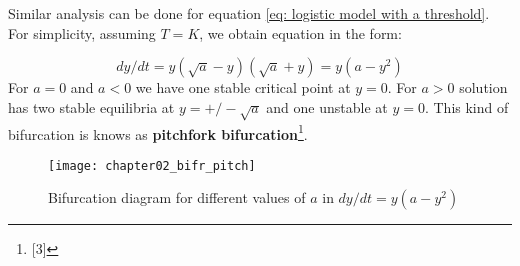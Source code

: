 Similar analysis can be done for equation \ref{eq: logistic model with a threshold}. For simplicity, assuming $T = K$, we obtain equation in the form:

\begin{equation}\label{eq: bifr_y(a-yy)}
dy/dt = y(\sqrt{a}-y)(\sqrt{a}+y) = y(a - y^2)
\end{equation}
For $a = 0$ and $a < 0$ we have one stable critical point at $y = 0$. For $a > 0$ solution has two stable equilibria at $y = +/- \sqrt{a}$ and one unstable at $y = 0$. This kind of bifurcation is knows as \textbf{pitchfork bifurcation}\footnote{[3]}.

\begin{figure}[h]
\centering
\texttt{[image: chapter02\_bifr\_pitch]}
\caption{Bifurcation diagram for different values of $a$ in $dy/dt = y(a-y^2)$}
\label{fig: bifr_pitch}
\end{figure}